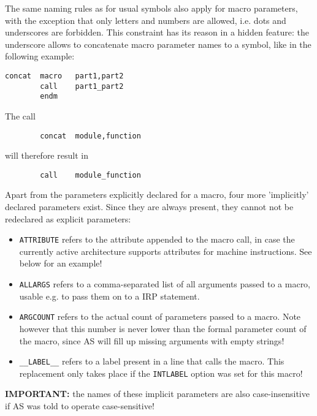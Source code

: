 \documentclass[12pt,twoside]{report}
\newcommand{\asname}{{AS}}
\begin{document}
The same naming rules as for usual symbols also apply for macro
parameters, with the exception that only letters and numbers are
allowed, i.e. dots and underscores are forbidden.  This constraint
has its reason in a hidden feature: the underscore allows to
concatenate macro parameter names to a symbol, like in the following
example:
\begin{verbatim}
concat  macro   part1,part2
        call    part1_part2
        endm
\end{verbatim}
The call
\begin{verbatim}
        concat  module,function
\end{verbatim}
will therefore result in
\begin{verbatim}
        call    module_function
\end{verbatim}
Apart from the parameters explicitly declared for a macro, four more
'implicitly' declared parameters exist.   Since they are always present,
they cannot not be redeclared as explicit parameters:
\begin{itemize}
\item{{\tt ATTRIBUTE} refers to the attribute appended to the macro call,
      in case the currently active architecture supports attributes for
      machine instructions.  See below for an example!}
\item{{\tt ALLARGS} refers to a comma-separated list of all arguments
      passed to a macro, usable e.g. to pass them on to a IRP statement.}
\item{{\tt ARGCOUNT} refers to the actual count of parameters passed to
      a macro.  Note however that this number is never lower than the
      formal parameter count of the macro, since \asname{} will fill up missing
      arguments with empty strings!}
\item{{\tt \_\_LABEL\_\_} refers to a label present in a line that calls the
      macro. This replacement only takes place if the {\tt INTLABEL}
      option was set for this macro!}
\end{itemize}
{\bf IMPORTANT:} the names of these implicit parameters are also
case-insensitive if \asname{} was told to operate case-sensitive!
\end{document}
